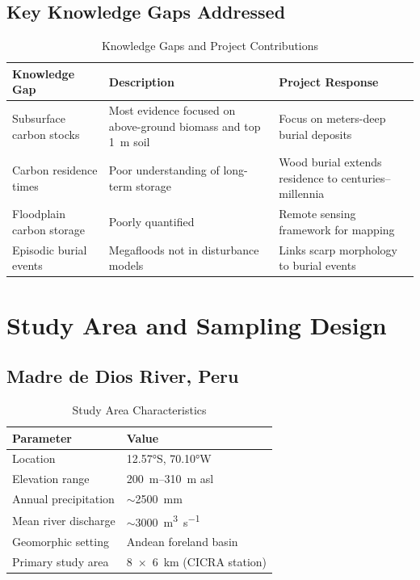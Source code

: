 \documentclass[11pt,letterpaper]{article}
\begin{document}
\subsection{Key Knowledge Gaps Addressed}

\begin{table}[h]
\centering
\caption{Knowledge Gaps and Project Contributions}
\label{tab:knowledge_gaps}
\begin{tabular}{p{3.5cm}p{5cm}p{4cm}}
\toprule
\textbf{Knowledge Gap} & \textbf{Description} & \textbf{Project Response} \\
\midrule
Subsurface carbon stocks & Most evidence focused on above-ground biomass and top \SI{1}{m} soil & Focus on meters-deep burial deposits \\
\addlinespace
Carbon residence times & Poor understanding of long-term storage & Wood burial extends residence to centuries--millennia \\
\addlinespace
Floodplain carbon storage & Poorly quantified & Remote sensing framework for mapping \\
\addlinespace
Episodic burial events & Megafloods not in disturbance models & Links scarp morphology to burial events \\
\bottomrule
\end{tabular}
\end{table}

\section{Study Area and Sampling Design}
\label{sec:study_area}

\subsection{Madre de Dios River, Peru}

\begin{table}[h]
\centering
\caption{Study Area Characteristics}
\label{tab:study_area}
\begin{tabular}{ll}
\toprule
\textbf{Parameter} & \textbf{Value} \\
\midrule
Location & \ang{12.57}S, \ang{70.10}W \\
Elevation range & \SIrange{200}{310}{m} asl \\
Annual precipitation & $\sim$\SI{2500}{mm} \\
Mean river discharge & $\sim$\SI{3000}{m^3~s^{-1}} \\
Geomorphic setting & Andean foreland basin \\
Primary study area & \SI{8 x 6}{km} (CICRA station) \\
\bottomrule
\end{tabular}
\end{table}
\end{document}
